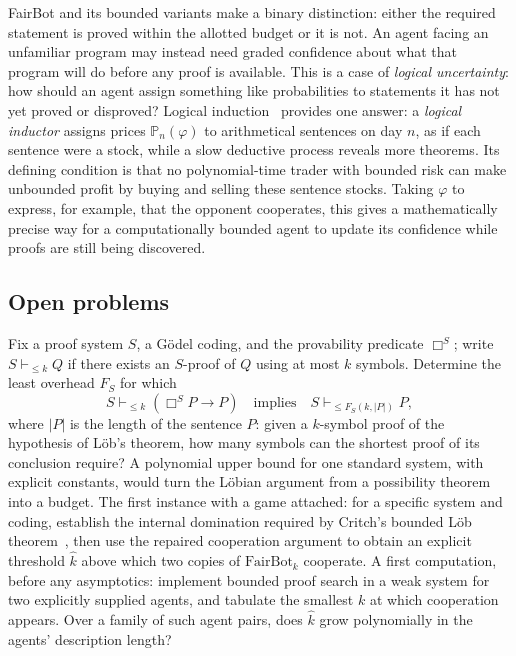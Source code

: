 FairBot and its bounded variants make a binary distinction: either the required statement is proved within the allotted budget or it is not. An agent facing an unfamiliar program may instead need graded confidence about what that program will do before any proof is available. This is a case of \emph{logical uncertainty}: how should an agent assign something like probabilities to statements it has not yet proved or disproved? Logical induction~\cite{garrabrant2016} provides one answer: a \emph{logical inductor} assigns prices $\mathbb{P}_n(\varphi)$ to arithmetical sentences on day $n$, as if each sentence were a stock, while a slow deductive process reveals more theorems. Its defining condition is that no polynomial-time trader with bounded risk can make unbounded profit by buying and selling these sentence stocks. Taking $\varphi$ to express, for example, that the opponent cooperates, this gives a mathematically precise way for a computationally bounded agent to update its confidence while proofs are still being discovered.

\subsection{Open problems}

\begin{openproblem}
Fix a proof system $S$, a G\"odel coding, and the provability predicate $\Box^S$; write $S\vdash_{\le k}Q$ if there exists an $S$-proof of $Q$ using at most $k$ symbols. Determine the least overhead $F_S$ for which
\[
   S\vdash_{\le k}(\Box^S P\to P)
   \quad\text{implies}\quad
   S\vdash_{\le F_S(k,|P|)} P,
\]
where $|P|$ is the length of the sentence $P$: given a $k$-symbol proof of the hypothesis of L\"ob's theorem, how many symbols can the shortest proof of its conclusion require? A polynomial upper bound for one standard system, with explicit constants, would turn the L\"obian argument from a possibility theorem into a budget. The first instance with a game attached: for a specific system and coding, establish the internal domination required by Critch's bounded L\"ob theorem~\cite{critch2016}, then use the repaired cooperation argument to obtain an explicit threshold $\hat k$ above which two copies of $\mathrm{FairBot}_k$ cooperate. A first computation, before any asymptotics: implement bounded proof search in a weak system for two explicitly supplied agents, and tabulate the smallest $k$ at which cooperation appears. Over a family of such agent pairs, does $\hat k$ grow polynomially in the agents' description length?
\end{openproblem}
